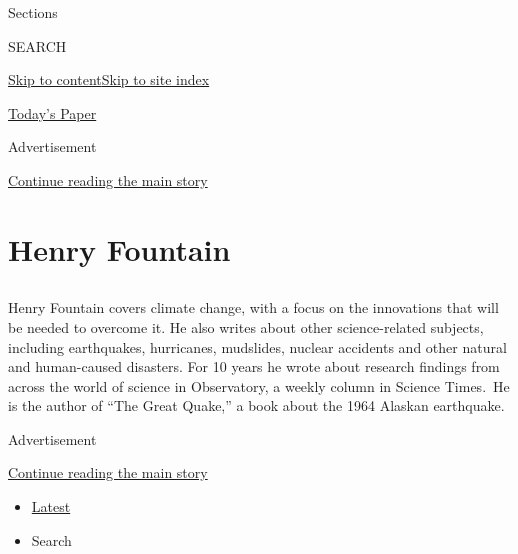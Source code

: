 Sections

SEARCH

\protect\hyperlink{site-content}{Skip to
content}\protect\hyperlink{site-index}{Skip to site index}

\href{https://myaccount.nytimes.com/auth/login?response_type=cookie\&client_id=vi}{}

\href{https://www.nytimes.com/section/todayspaper}{Today's Paper}

Advertisement

\protect\hyperlink{after-top}{Continue reading the main story}

\hypertarget{henry-fountain}{%
\section{Henry Fountain}\label{henry-fountain}}

\subsection{}

Henry Fountain covers climate change, with a focus on the innovations
that will be needed to overcome it. He also writes about other
science-related subjects, including earthquakes, hurricanes, mudslides,
nuclear accidents and other natural and human-caused disasters. For 10
years he wrote about research findings from across the world of science
in Observatory, a weekly column in Science Times.~He is the author of
``The Great Quake,'' a book about the 1964 Alaskan earthquake.

Advertisement

\protect\hyperlink{after-mid1}{Continue reading the main story}

\begin{itemize}
\tightlist
\item
  \protect\hyperlink{stream-panel}{Latest}
\item
  Search
\end{itemize}

